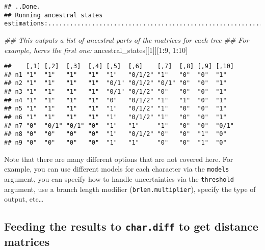 \documentclass[
]{book}
\newenvironment{Shaded}{\begin{snugshade}}{\end{snugshade}}
\newcommand{\CommentTok}[1]{\textcolor[rgb]{0.56,0.35,0.01}{\textit{#1}}}
\newcommand{\DecValTok}[1]{\textcolor[rgb]{0.00,0.00,0.81}{#1}}
\newcommand{\NormalTok}[1]{#1}
\newcommand{\OperatorTok}[1]{\textcolor[rgb]{0.81,0.36,0.00}{\textbf{#1}}}
\begin{document}
\begin{verbatim}
## ..Done.
## Running ancestral states estimations:.....................................................................................................................................................................................................................................................Done.
\end{verbatim}

\begin{Shaded}
\begin{Highlighting}[]
\CommentTok{\#\# This outputs a list of ancestral parts of the matrices for each tree}
\CommentTok{\#\# For example, here\textquotesingle{}s the first one:}
\NormalTok{ancestral\_states[[}\DecValTok{1}\NormalTok{]][}\DecValTok{1}\OperatorTok{:}\DecValTok{9}\NormalTok{, }\DecValTok{1}\OperatorTok{:}\DecValTok{10}\NormalTok{]}
\end{Highlighting}
\end{Shaded}

\begin{verbatim}
##    [,1] [,2]  [,3]  [,4] [,5]  [,6]    [,7]  [,8] [,9] [,10]
## n1 "1"  "1"   "1"   "1"  "1"   "0/1/2" "1"   "0"  "0"  "1"  
## n2 "1"  "1"   "1"   "1"  "0/1" "0/1/2" "0/1" "0"  "0"  "1"  
## n3 "1"  "1"   "1"   "1"  "0/1" "0/1/2" "0"   "0"  "0"  "1"  
## n4 "1"  "1"   "1"   "1"  "0"   "0/1/2" "1"   "1"  "0"  "1"  
## n5 "1"  "1"   "1"   "1"  "1"   "0/1/2" "1"   "0"  "0"  "1"  
## n6 "1"  "1"   "1"   "1"  "1"   "0/1/2" "1"   "0"  "0"  "1"  
## n7 "0"  "0/1" "0/1" "0"  "1"   "1"     "1"   "0"  "0"  "0/1"
## n8 "0"  "0"   "0"   "0"  "1"   "0/1/2" "0"   "0"  "1"  "0"  
## n9 "0"  "0"   "0"   "0"  "1"   "1"     "0"   "0"  "1"  "0"
\end{verbatim}

Note that there are many different options that are not covered here.
For example, you can use different models for each character via the \texttt{models} argument, you can specify how to handle uncertainties via the \texttt{threshold} argument, use a branch length modifier (\texttt{brlen.multiplier}), specify the type of output, etc\ldots{}

\hypertarget{feeding-the-results-to-char.diff-to-get-distance-matrices}{%
\subsection{\texorpdfstring{Feeding the results to \texttt{char.diff} to get distance matrices}{Feeding the results to char.diff to get distance matrices}}\label{feeding-the-results-to-char.diff-to-get-distance-matrices}}
\end{document}
